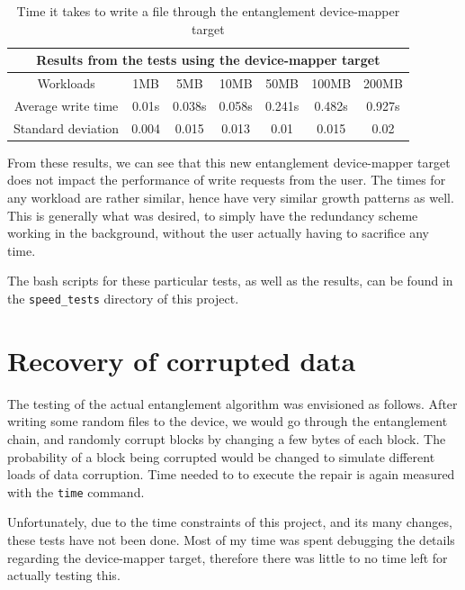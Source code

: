 \documentclass[a4paper,11pt,oneside]{report}
\begin{document}
\begin{table}[!h]
    \centering
    \begin{tabular}{|c|c|c|c|c|c|c|}
    \hline
       \multicolumn{7}{|c|}{Results from the tests using the device-mapper target} \\
       \hline
       Workloads  & 1MB & 5MB & 10MB & 50MB & 100MB & 200MB \\
       \hline
       Average write time  & 0.01s & 0.038s & 0.058s & 0.241s & 0.482s & 0.927s \\
       \hline
       Standard deviation  & 0.004 & 0.015 & 0.013 & 0.01 & 0.015 & 0.02 \\
    \hline
    \end{tabular}
    \caption{Time it takes to write a file through the entanglement device-mapper target}
    \label{tab:device_mapper_target}
\end{table}

From these results, we can see that this new entanglement device-mapper target does not impact the performance of write requests from the user. The times for any workload are rather similar, hence have very similar growth patterns as well. This is generally what was desired, to simply have the redundancy scheme working in the background, without the user actually having to sacrifice any time. 

The bash scripts for these particular tests, as well as the results, can be found in the \texttt{speed\_tests} directory of this project. 

\section{Recovery of corrupted data} 
The testing of the actual entanglement algorithm was envisioned as follows. After writing some random files to the device, we would go through the entanglement chain, and randomly corrupt blocks by changing a few bytes of each block. The probability of a block being corrupted would be changed to simulate different loads of data corruption. Time needed to to execute the repair is again measured with the \texttt{time} command. 

Unfortunately, due to the time constraints of this project, and its many changes, these tests have not been done. Most of my time was spent debugging the details regarding the device-mapper target, therefore there was little to no time left for actually testing this. 
\end{document}
